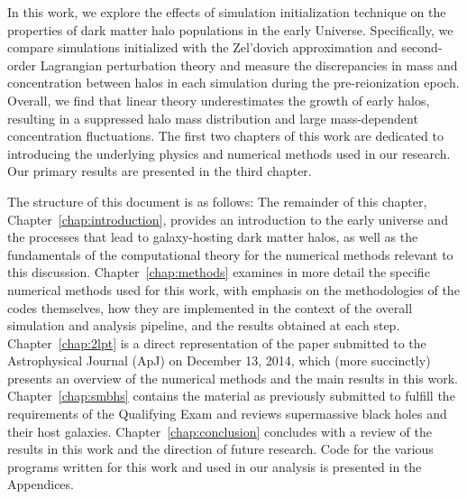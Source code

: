 
%
%
%
%


In this work, we explore the effects of simulation initialization technique on the properties of dark matter halo populations in the early Universe.  Specifically, we compare simulations initialized with the Zel'dovich approximation and second-order Lagrangian perturbation theory and measure the discrepancies in mass and concentration between halos in each simulation during the pre-reionization epoch.  Overall, we find that linear theory underestimates the growth of early halos, resulting in a suppressed halo mass distribution and large mass-dependent concentration fluctuations.  The first two chapters of this work are dedicated to introducing the underlying physics and numerical methods used in our research.  Our primary results are presented in the third chapter.

The structure of this document is as follows:  The remainder of this chapter, Chapter~\ref{chap:introduction}, provides an introduction to the early universe and the processes that lead to galaxy-hosting dark matter halos, as well as the fundamentals of the computational theory for the numerical methods relevant to this discussion.  Chapter~\ref{chap:methods} examines in more detail the specific numerical methods used for this work, with emphasis on the methodologies of the codes themselves, how they are implemented in the context of the overall simulation and analysis pipeline, and the results obtained at each step.  Chapter~\ref{chap:2lpt} is a direct representation of the paper submitted to the Astrophysical Journal (ApJ) on December 13, 2014, which (more succinctly) presents an overview of the numerical methods and the main results in this work.  Chapter~\ref{chap:smbhs} contains the material as previously submitted to fulfill the requirements of the Qualifying Exam and reviews supermassive black holes and their host galaxies.  Chapter~\ref{chap:conclusion} concludes with a review of the results in this work and the direction of future research.  Code for the various programs written for this work and used in our analysis is presented in the Appendices.




